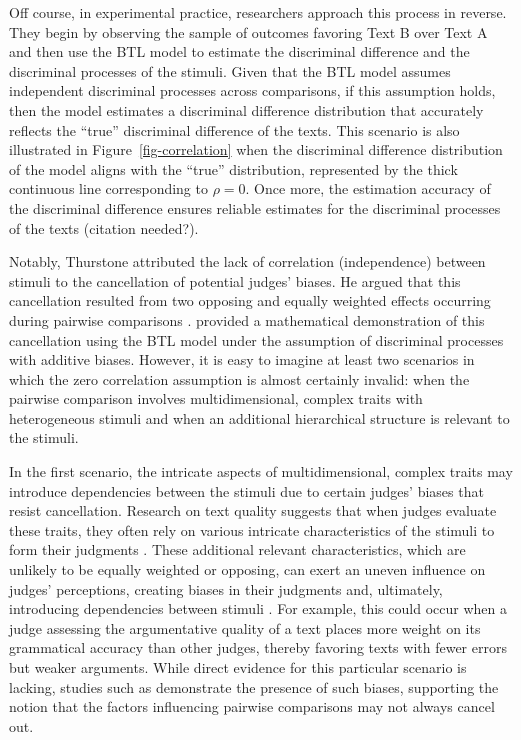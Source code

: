 \documentclass[
  authoryear,
  review,
  1p]{elsarticle}
\begin{document}
Off course, in experimental practice, researchers approach this process
in reverse. They begin by observing the sample of outcomes favoring Text
B over Text A and then use the BTL model to estimate the discriminal
difference and the discriminal processes of the stimuli. Given that the
BTL model assumes independent discriminal processes across comparisons,
if this assumption holds, then the model estimates a discriminal
difference distribution that accurately reflects the ``true''
discriminal difference of the texts. This scenario is also illustrated
in Figure~\ref{fig-correlation} when the discriminal difference
distribution of the model aligns with the ``true'' distribution,
represented by the thick continuous line corresponding to \(\rho=0\).
Once more, the estimation accuracy of the discriminal difference ensures
reliable estimates for the discriminal processes of the texts {(citation
needed?)}.

Notably, Thurstone attributed the lack of correlation (independence)
between stimuli to the cancellation of potential judges' biases. He
argued that this cancellation resulted from two opposing and equally
weighted effects occurring during pairwise comparisons
\citep[pp.~268]{Thurstone_1927b}. \citet{Andrich_1978} provided a
mathematical demonstration of this cancellation using the BTL model
under the assumption of discriminal processes with additive biases.
However, it is easy to imagine at least two scenarios in which the zero
correlation assumption is almost certainly invalid: when the pairwise
comparison involves multidimensional, complex traits with heterogeneous
stimuli and when an additional hierarchical structure is relevant to the
stimuli.

In the first scenario, the intricate aspects of multidimensional,
complex traits may introduce dependencies between the stimuli due to
certain judges' biases that resist cancellation. Research on text
quality suggests that when judges evaluate these traits, they often rely
on various intricate characteristics of the stimuli to form their
judgments
\citep{vanDaal_et_al_2016, Lesterhuis_2018, Chambers_et_al_2022}. These
additional relevant characteristics, which are unlikely to be equally
weighted or opposing, can exert an uneven influence on judges'
perceptions, creating biases in their judgments and, ultimately,
introducing dependencies between stimuli
\citep[pp.~346]{vanderLinden_et_al_2017_II}. For example, this could
occur when a judge assessing the argumentative quality of a text places
more weight on its grammatical accuracy than other judges, thereby
favoring texts with fewer errors but weaker arguments. While direct
evidence for this particular scenario is lacking, studies such as
\citet{Pollitt_et_al_2003} demonstrate the presence of such biases,
supporting the notion that the factors influencing pairwise comparisons
may not always cancel out.
\end{document}
